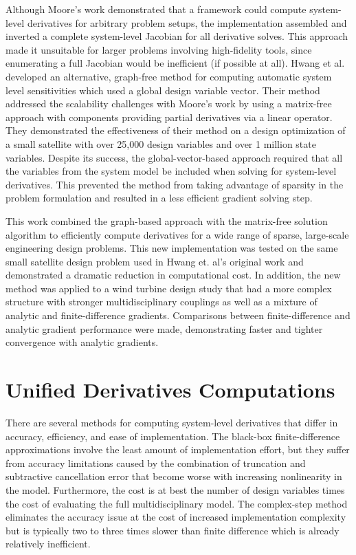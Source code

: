 \documentclass[]{aiaa-tc} %
\begin{document}
    Although Moore's work demonstrated that a framework could compute system-level derivatives for arbitrary
    problem setups, the implementation assembled and inverted a complete system-level Jacobian for
    all derivative solves.  This approach made it unsuitable for larger problems involving
    high-fidelity tools, since enumerating a full Jacobian would be inefficient (if possible at all).
    Hwang et al. developed an alternative, graph-free method for computing automatic system
    level sensitivities which used a global design variable vector\cite{CADRE2012}. Their method
    addressed the scalability challenges with Moore's work by using a matrix-free approach with
    components providing partial derivatives via a linear operator. They demonstrated the
    effectiveness of their method on a design optimization of a small satellite
    with over 25,000 design variables and over 1 million state variables. Despite its success,
    the global-vector-based approach required that all the variables from the system model be
    included when solving for system-level derivatives. This prevented the method
    from taking advantage of sparsity in the problem formulation and resulted in a less efficient gradient solving step.

    This work combined the graph-based approach with the matrix-free solution algorithm
    to efficiently compute derivatives for a wide range of sparse, large-scale engineering
    design problems. This new implementation was tested on the same small satellite design problem used in
    Hwang et. al's original work and demonstrated a dramatic reduction in computational cost. In addition,
    the new method was applied to a wind turbine design study that had a more
    complex structure with stronger multidisciplinary couplings as well as a mixture of
    analytic and finite-difference gradients. Comparisons between finite-difference and analytic gradient
    performance were made, demonstrating faster and tighter convergence with analytic gradients.

  \section{Unified Derivatives Computations}

    There are several methods for computing system-level derivatives that differ in accuracy, efficiency, and ease of implementation.
    The black-box finite-difference approximations involve the least amount of implementation effort, but they suffer from accuracy
    limitations caused by the combination of truncation and subtractive cancellation error that become worse with increasing nonlinearity in the model.
    Furthermore, the cost is at best the number of design variables times the cost of evaluating the full multidisciplinary model.
    The complex-step method eliminates the accuracy issue at the cost of increased implementation complexity but is typically 
    two to three times slower than finite difference which is already relatively inefficient.
\end{document}
